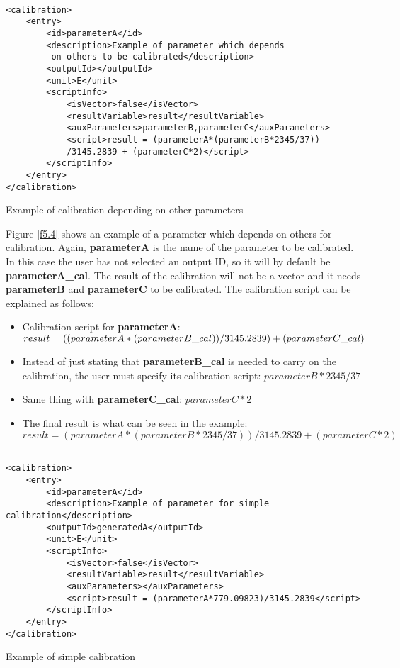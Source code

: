 \begin{table}[H]
\lstset{language=XML}
\begin{lstlisting}

<calibration>
	<entry>
		<id>parameterA</id>
		<description>Example of parameter which depends
		 on others to be calibrated</description>
		<outputId></outputId>
		<unit>E</unit>
		<scriptInfo>
			<isVector>false</isVector>
			<resultVariable>result</resultVariable>
			<auxParameters>parameterB,parameterC</auxParameters>
			<script>result = (parameterA*(parameterB*2345/37))
			/3145.2839 + (parameterC*2)</script>
		</scriptInfo>
	</entry>
</calibration>
\end{lstlisting}
\caption{Example of calibration depending on other parameters}
\label{Table5.3}
\end{table}

Figure \ref{f5.4} shows an example of a parameter which depends on others for calibration. Again, \textbf{parameterA} is the name of the parameter to be calibrated. In this case the user has not selected an output ID, so it will by default be \textbf{parameterA\_cal}. The result of the calibration will not be a vector and it needs \textbf{parameterB} and \textbf{parameterC} to be calibrated. The calibration script can be explained as follows:
\begin{itemize}
\item Calibration script for \textbf{parameterA}: $result = ((parameterA*(parameterB\_cal))\\			/3145.2839) + (parameterC\_cal)$
\item Instead of just stating that \textbf{parameterB\_cal} is needed to carry on the calibration, the user must specify its calibration script: $parameterB*2345/37$
\item Same thing with \textbf{parameterC\_cal}: $parameterC*2$
\item The final result is what can be seen in the example: $result = (parameterA*(parameterB*2345/37))/3145.2839 + (parameterC*2)$
\end{itemize}
\begin{table}[H]
\lstset{language=XML}
\begin{lstlisting}

<calibration>
	<entry>
		<id>parameterA</id>
		<description>Example of parameter for simple calibration</description>
		<outputId>generatedA</outputId>
		<unit>E</unit>
		<scriptInfo>
			<isVector>false</isVector>
			<resultVariable>result</resultVariable>
			<auxParameters></auxParameters>
			<script>result = (parameterA*779.09823)/3145.2839</script>
		</scriptInfo>
	</entry>
</calibration>
\end{lstlisting}
\caption{Example of simple calibration}
\label{Table5.4}
\end{table}



